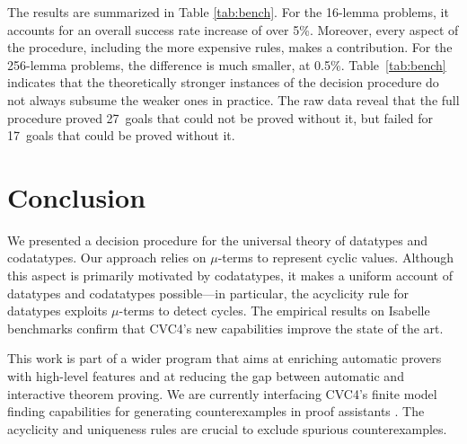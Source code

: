 \documentclass[letter]{article}
\theoremstyle{definition}
\begin{document}
The results are summarized in Table \ref{tab:bench}.
For the 16-lemma problems, it accounts for an overall
success rate increase of over 5\%.
Moreover, every aspect of the procedure, including the
more expensive rules, makes a contribution.
%
For the 256-lemma problems, the difference
is much smaller, at 0.5\%.
Table~\ref{tab:bench} indicates that
the theoretically stronger instances of the decision
procedure do not always subsume the weaker ones in practice.
The raw data reveal that the full procedure proved 27~goals that
could not be proved without it, but failed for 17~goals that could be proved
without it.

\section{Conclusion}
\label{sec:conclusion}

We presented a decision procedure for the universal theory of datatypes and
codatatypes. Our approach relies on $\mu$-terms to represent cyclic values.
Although this aspect is primarily motivated by codatatypes, it makes
a uniform account of datatypes and codatatypes possible---in particular,
the acyclicity rule for datatypes exploits $\mu$-terms to detect cycles.
The empirical results on Isabelle benchmarks
confirm that CVC4's new capabilities improve the state of the art.

This work is part of a wider program that aims at enriching automatic provers
with high-level features and at reducing the gap between automatic and
interactive theorem proving.
We are currently interfacing CVC4's finite model finding capabilities
for generating counterexamples in proof assistants
\cite{reynolds-et-al-2015-smt}.
The acyclicity and uniqueness rules are
crucial to exclude spurious counterexamples.
\end{document}

